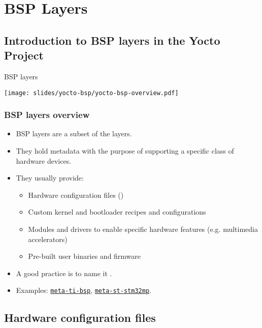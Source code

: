 \section{BSP Layers}

\subsection{Introduction to BSP layers in the Yocto Project}

\begin{frame}{BSP layers}
  \begin{center}
    \texttt{[image: slides/yocto-bsp/yocto-bsp-overview.pdf]}
  \end{center}
\end{frame}

\begin{frame}
  \frametitle{BSP layers overview}
  \begin{itemize}
  \item BSP layers are a subset of the layers.
  \item They hold metadata with the purpose of supporting a specific class
    of hardware devices.
    \item They usually provide:
      \begin{itemize}
        \item Hardware configuration files ()
        \item Custom kernel and bootloader recipes and configurations
        \item Modules and drivers to enable specific hardware features
          (e.g. multimedia accelerators)
        \item Pre-built user binaries and firmware
      \end{itemize}
    \item A good practice is to name it .
    \item Examples:
      \href{https://git.yoctoproject.org/meta-ti/tree/meta-ti-bsp}{\tt meta-ti-bsp},
      \href{https://github.com/STMicroelectronics/meta-st-stm32mp}{\tt meta-st-stm32mp}.
  \end{itemize}
\end{frame}

\subsection{Hardware configuration files}

